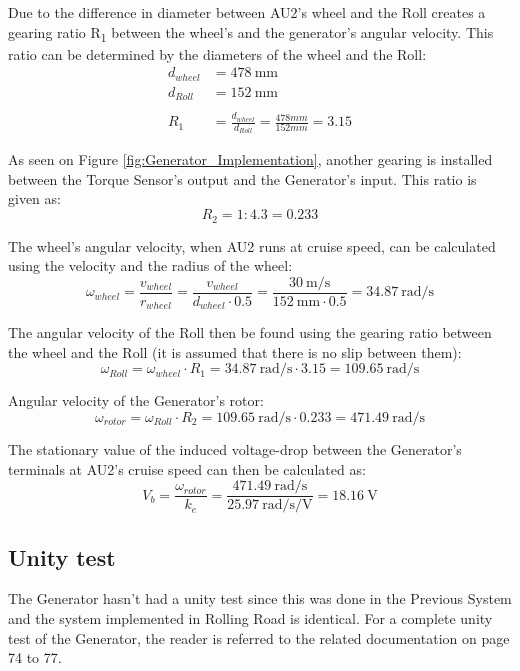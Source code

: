 Due to the difference in diameter between AU2's wheel and the Roll creates a gearing ratio R\textsubscript{1} between the wheel's and the generator's angular velocity. This ratio can be determined by the diameters of the wheel and the Roll:
\begin{equation}
	\begin{split}
		d_{wheel} &= \SI{478}{\milli \meter}\\
		d_{Roll} &= \SI{152}{\milli \meter}\\
		\\
		R_1 &= \frac{d_{wheel}}{d_{Roll}} = \frac{478 mm}{152 mm} = 3.15
	\end{split}
\end{equation}

As seen on Figure \vref{fig:Generator_Implementation}, another gearing is installed between the Torque Sensor's output and the Generator's input. This ratio is given as:
\begin{equation}
	R_2 = 1:4.3 = 0.233
\end{equation}

The wheel's angular velocity, when AU2 runs at cruise speed, can be calculated using the velocity and the radius of the wheel:
\begin{equation}
	\omega_{wheel} = \frac{v_{wheel}}{r_{wheel}} = \frac{v_{wheel}}{d_{wheel} \cdot 0.5} = \frac{\SI[per-mode=fraction]{30}{\meter \per \second}}{\SI{152}{\milli \meter} \cdot 0.5} = \SI[per-mode=fraction]{34.87}{\radian \per \second}
\end{equation}

The angular velocity of the Roll then be found using the gearing ratio between the wheel and the Roll (it is assumed that there is no slip between them):
\begin{equation}
		\omega_{Roll} = \omega_{wheel} \cdot R_1 = \SI[per-mode=fraction]{34.87}{\radian \per \second} \cdot 3.15 = \SI[per-mode=fraction]{109.65}{\radian \per \second}
\end{equation}

Angular velocity of the Generator's rotor:
\begin{equation}
		\omega_{rotor} = \omega_{Roll} \cdot R_2 = \SI[per-mode=fraction]{109.65}{\radian \per \second} \cdot 0.233 = \SI[per-mode=fraction]{471.49}{\radian \per \second}
\end{equation}

The stationary value of the induced voltage-drop between the Generator's terminals at AU2's cruise speed can then be calculated as:
\begin{equation}
		V_b = \frac{\omega_{rotor}}{k_e} = \frac{\SI[per-mode=fraction]{471.49}{\radian \per \second}}{\SI[per-mode=fraction]{25.97}{\radian \per \second \per \volt}} = \SI{18.16}{\volt}
\end{equation}

\subsection{Unity test}
The Generator hasn't had a unity test since this was done in the Previous System\cite{BAC_rullefelt} and the system implemented in Rolling Road is identical. For a complete unity test of the Generator, the reader is referred to the related documentation on page 74 to 77.